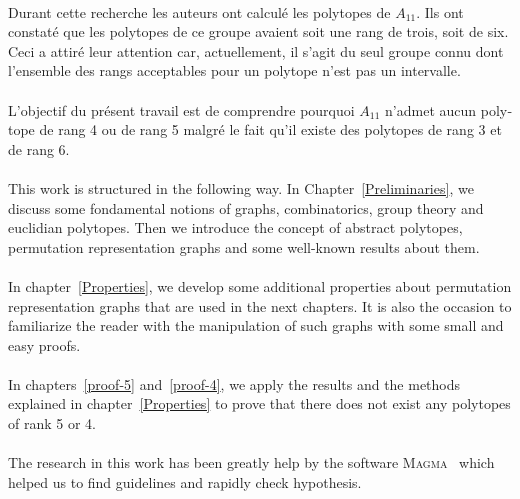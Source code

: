 \begin{otherlanguage}{french}
\paragraph{}
Durant cette recherche les auteurs ont calculé les polytopes de $A_{11}$. Ils ont constaté que les polytopes de ce groupe avaient soit une rang de trois, soit de six. Ceci a attiré leur attention car, actuellement, il s'agit du seul groupe connu dont l'ensemble des rangs acceptables pour un polytope n'est pas un intervalle.

\paragraph{}
L'objectif du présent travail est de comprendre pourquoi $A_{11}$ n'admet aucun polytope de rang 4 ou de rang 5 malgré le fait qu'il existe des polytopes de rang 3 et de rang 6.

\end{otherlanguage}

\paragraph{}
This work is structured in the following way. In Chapter~\ref{Preliminaries}, we discuss some fondamental notions of graphs, combinatorics, group theory and euclidian polytopes. Then we introduce the concept of abstract polytopes, permutation representation graphs and some well-known results about them.

\paragraph{}
In chapter~\ref{Properties}, we develop some additional properties about permutation representation graphs that are used in the next chapters. It is also the occasion to familiarize the reader with the manipulation of such graphs with some small and easy proofs.

\paragraph{}
In chapters~\ref{proof-5} and~\ref{proof-4}, we apply the results and the methods explained in chapter~\ref{Properties} to prove that there does not exist any polytopes of rank 5 or 4.

\paragraph{}
The research in this work has been greatly help by the software \textsc{Magma}~\cite{magma} which helped us to find guidelines and rapidly check hypothesis.
